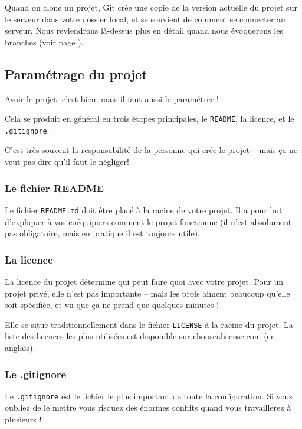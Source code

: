 \documentclass[10pt,a4paper]{article}
\begin{document}
Quand on clone un projet, Git crée une copie de la version actuelle du projet sur le serveur dans votre dossier local, et se souvient de comment se connecter au serveur. Nous reviendrons là-dessus plus en détail quand nous évoquerons les branches (voir page \pageref{branches}).

\subsection{Paramétrage du projet}

Avoir le projet, c'est bien, mais il faut aussi le paramétrer !

Cela se produit en général en trois étapes principales, le {\tt README}, la licence, et le {\tt .gitignore}.

C'est très souvent la responsabilité de la personne qui crée le projet -- mais ça ne veut pas dire qu'il faut le négliger!

\subsubsection{Le fichier README}

Le fichier {\tt README.md} doit être placé à la racine de votre projet. Il a pour but d'expliquer à vos coéquipiers comment le projet fonctionne (il n'est absolument pas obligatoire, mais en pratique il est toujours utile).

\subsubsection{La licence}

La licence du projet détermine qui peut faire quoi avec votre projet. Pour un projet privé, elle n'est pas importante -- mais les profs aiment beaucoup qu'elle soit spécifiée, et vu que ça ne prend que quelques minutes !

Elle se situe traditionnellement dans le fichier {\tt LICENSE} à la racine du projet. La liste des licences les plus utilisées est disponible sur \href{https://choosealicense.com/}{choosealicense.com} (en anglais).

\subsubsection{Le .gitignore\label{gitignore}}

Le {\tt .gitignore} est le fichier le plus important de toute la configuration. Si vous oubliez de le mettre vous risquez des énormes conflits quand vous travaillerez à plusieurs !
\end{document}
